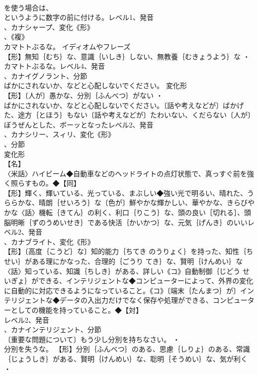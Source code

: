 \documentclass[8pt]{extreport}
\begin{document}
\begin{CJK}{UTF8}{min}
\\	を使う場合は、
\\	というように数字の前に付ける。レベル1、発音
\\	、カナシャープ、変化《形》
\\	、《複》
\\	カマトトぶるな。	イディオムやフレーズ 
\\	【形】無知｛むち｝な、意識｛いしき｝しない、無教養｛むきょうよう｝な ・
\\	カマトトぶるな。レベル4、発音
\\	、カナイグノラント、分節
\\	ばかにされないか、などと心配しないでください。	変化形 
\\	【形】〔人が〕愚かな、分別｛ふんべつ｝がない ・
\\	ばかにされないか、などと心配しないでください。〔話や考えなどが〕ばかげた、途方｛とほう｝もない〔話や考えなどが〕たわいない、くだらない〔人が〕ぼうぜんとした、ボーッとなったレベル2、発音
\\	、カナシリー、スィリ、変化《形》
\\	、分節
\\	変化形 
\\	【名】
\\	〈米話〉ハイビーム◆自動車などのヘッドライトの点灯状態で、真っすぐ前を強く照らすもの。◆【同】
\\	【形】輝く、輝いている、光っている、まぶしい◆強い光で明るい、晴れた、うららかな、晴朗｛せいろう｝な〔色が〕鮮やかな輝かしい、華やかな、きらびやかな〈話〉機転｛きてん｝の利く、利口｛りこう｝な、頭の良い［切れる］、頭脳明晰｛ずのうめいせき｝である快活｛かいかつ｝な、元気｛げんき｝のいいレベル2、発音
\\	、カナブライト、変化《形》
\\	【形】〔高度｛こうど｝な〕知的能力｛ちてき のうりょく｝を持った、知性｛ちせい｝がある理にかなった、合理的｛ごうり てき｝な、賢明｛けんめい｝な〈話〉知っている、知識｛ちしき｝がある、詳しい《コ》自動制御｛じどう せいぎょ｝ができる、インテリジェントな◆コンピューターによって、外界の変化に自動的に対応できるようになっていること。《コ》〔端末｛たんまつ｝が〕インテリジェントな◆データの入出力だけでなく保存や処理ができる、コンピューターとしての機能を持っていること。◆【対】
\\	レベル2、発音
\\	、カナインテリジェント、分節
\\	〔重要な問題について〕もう少し分別を持ちなさい。 ・
\\	分別を失うな。		【形】分別｛ふんべつ｝のある、思慮｛しりょ｝のある、常識｛じょうしき｝がある、賢明｛けんめい｝な、聡明｛そうめい｝な、気が利く ・

\end{CJK}
\end{document}
